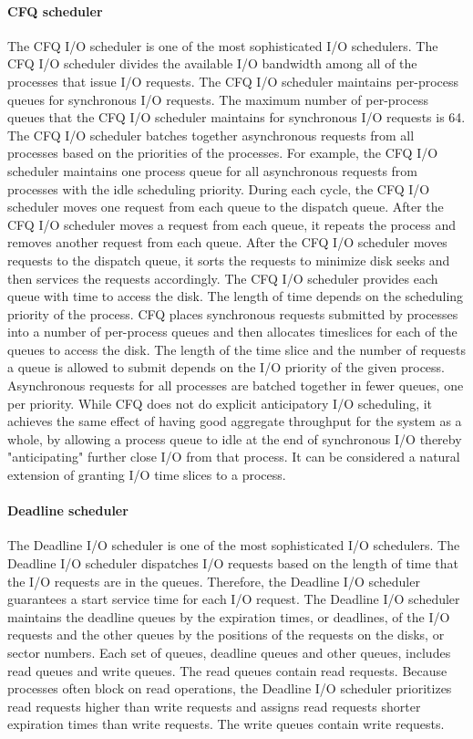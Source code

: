 \documentclass{acmsig}
\begin{document}
    \paragraph{CFQ scheduler}
    The CFQ I/O scheduler is one of the most sophisticated I/O schedulers. The CFQ I/O scheduler divides the available I/O bandwidth among all of the processes that issue I/O requests. The CFQ I/O scheduler maintains per-process queues for synchronous I/O requests. The maximum number of per-process queues that the CFQ I/O scheduler maintains for synchronous I/O requests is 64. The CFQ I/O scheduler batches together asynchronous requests from all processes based on the priorities of the processes. For example, the CFQ I/O scheduler maintains one process queue for all asynchronous requests from processes with the idle scheduling priority.
    During each cycle, the CFQ I/O scheduler moves one request from each queue to the dispatch queue. After the CFQ I/O scheduler moves a request from each queue, it repeats the process and removes another request from each queue. After the CFQ I/O scheduler moves requests to the dispatch queue, it sorts the requests to minimize disk seeks and then services the requests accordingly. The CFQ I/O scheduler provides each queue with time to access the disk. The length of time depends on the scheduling priority of the process.
    CFQ places synchronous requests submitted by processes into a number of per-process queues and then allocates timeslices for each of the queues to access the disk. The length of the time slice and the number of requests a queue is allowed to submit depends on the I/O priority of the given process. Asynchronous requests for all processes are batched together in fewer queues, one per priority. While CFQ does not do explicit anticipatory I/O scheduling, it achieves the same effect of having good aggregate throughput for the system as a whole, by allowing a process queue to idle at the end of synchronous I/O thereby "anticipating" further close I/O from that process. It can be considered a natural extension of granting I/O time slices to a process.

    \paragraph{Deadline scheduler}
    The Deadline I/O scheduler is one of the most sophisticated I/O schedulers. The Deadline I/O scheduler dispatches I/O requests based on the length of time that the I/O requests are in the queues. Therefore, the Deadline I/O scheduler guarantees a start service time for each I/O request. The Deadline I/O scheduler maintains the deadline queues by the expiration times, or deadlines, of the I/O requests and the other queues by the positions of the requests on the disks, or sector numbers. Each set of queues, deadline queues and other queues, includes read queues and write queues. The read queues contain read requests. Because processes often block on read operations, the Deadline I/O scheduler prioritizes read requests higher than write requests and assigns read requests shorter expiration times than write requests. The write queues contain write requests.
\end{document}
